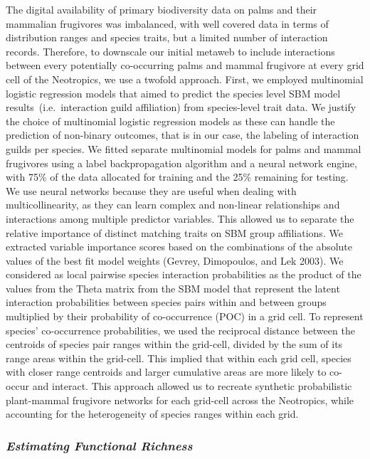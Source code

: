\documentclass[
]{agujournal2019}
\begin{document}
The digital availability of primary biodiversity data on palms and their
mammalian frugivores was imbalanced, with well covered data in terms of
distribution ranges and species traits, but a limited number of
interaction records. Therefore, to downscale our initial metaweb to
include interactions between every potentially co-occurring palms and
mammal frugivore at every grid cell of the Neotropics, we use a twofold
approach. First, we employed multinomial logistic regression models that
aimed to predict the species level SBM model results~(i.e.~interaction
guild affiliation) from species-level trait data. We justify the choice
of multinomial logistic regression models as these can handle the
prediction of non-binary outcomes, that is in our case, the labeling of
interaction guilds per species. We fitted separate multinomial models
for palms and mammal frugivores using a label backpropagation algorithm
and a neural network engine, with 75\% of the data allocated for
training and the 25\% remaining for testing. We use neural networks
because they are useful when dealing with multicollinearity, as they can
learn complex and non-linear relationships and interactions among
multiple predictor variables. This allowed us to separate the relative
importance of distinct matching traits on SBM group affiliations. We
extracted variable importance scores based on the combinations of the
absolute values of the best fit model weights (Gevrey, Dimopoulos, and
Lek 2003). We considered as local pairwise species interaction
probabilities as the product of the values from the Theta matrix from
the SBM model that represent the latent interaction probabilities
between species pairs within and between groups multiplied by their
probability of co-occurrence (POC) in a grid cell. To represent species'
co-occurrence probabilities, we used the reciprocal distance between the
centroids of species pair ranges within the grid-cell, divided by the
sum of its range areas within the grid-cell. This implied that within
each grid cell, species with closer range centroids and larger
cumulative areas are more likely to co-occur and interact. This approach
allowed us to recreate synthetic probabilistic plant-mammal frugivore
networks for each grid-cell across the Neotropics, while accounting for
the heterogeneity of species ranges within each grid.

\subsubsection{\texorpdfstring{\emph{Estimating Functional
Richness}}{Estimating Functional Richness}}\label{estimating-functional-richness}
\end{document}
